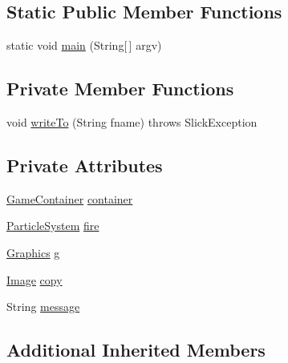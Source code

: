 \subsection*{Static Public Member Functions}
\begin{DoxyCompactItemize}
\item 
static void \mbox{\hyperlink{classorg_1_1newdawn_1_1slick_1_1tests_1_1_image_out_test_a9c7d863c46dcf109fdd07bcae4678fec}{main}} (String\mbox{[}$\,$\mbox{]} argv)
\end{DoxyCompactItemize}
\subsection*{Private Member Functions}
\begin{DoxyCompactItemize}
\item 
void \mbox{\hyperlink{classorg_1_1newdawn_1_1slick_1_1tests_1_1_image_out_test_a94d61b055da617dcb845d5288c42cc74}{write\+To}} (String fname)  throws Slick\+Exception 
\end{DoxyCompactItemize}
\subsection*{Private Attributes}
\begin{DoxyCompactItemize}
\item 
\mbox{\hyperlink{classorg_1_1newdawn_1_1slick_1_1_game_container}{Game\+Container}} \mbox{\hyperlink{classorg_1_1newdawn_1_1slick_1_1tests_1_1_image_out_test_a09db11b63df42087043028eceef5d69a}{container}}
\item 
\mbox{\hyperlink{classorg_1_1newdawn_1_1slick_1_1particles_1_1_particle_system}{Particle\+System}} \mbox{\hyperlink{classorg_1_1newdawn_1_1slick_1_1tests_1_1_image_out_test_a2e0a07e6c79bc05ee2dea61df862bee1}{fire}}
\item 
\mbox{\hyperlink{classorg_1_1newdawn_1_1slick_1_1_graphics}{Graphics}} \mbox{\hyperlink{classorg_1_1newdawn_1_1slick_1_1tests_1_1_image_out_test_a0007b2187e2d4d26bdb2d90b39c62479}{g}}
\item 
\mbox{\hyperlink{classorg_1_1newdawn_1_1slick_1_1_image}{Image}} \mbox{\hyperlink{classorg_1_1newdawn_1_1slick_1_1tests_1_1_image_out_test_ad8082ef3214a67735e03352b0407d0d8}{copy}}
\item 
String \mbox{\hyperlink{classorg_1_1newdawn_1_1slick_1_1tests_1_1_image_out_test_a96846c61934f6af57af5518de174d7ee}{message}}
\end{DoxyCompactItemize}
\subsection*{Additional Inherited Members}


